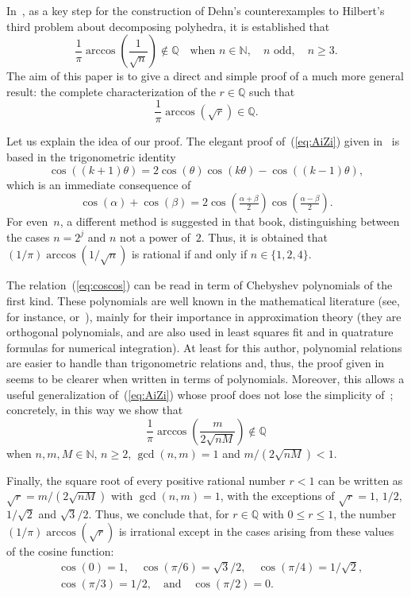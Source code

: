 \documentclass[10pt,a4paper]{article}
\newcommand{\Q}{\mathbb{Q}}
\newcommand{\N}{\mathbb{N}}
\theoremstyle{remark}
\begin{document}
In~\cite[Chapter~6]{AiZi}, as a key step for the construction of Dehn's
counterexamples to Hilbert's third problem about decomposing 
polyhedra, it is established that
\begin{equation}
\label{eq:AiZi}
  \frac{1}{\pi} \arccos\left(\frac{1}{\sqrt{n}}\right) \notin \Q
  \quad\mbox{when }n \in \N,\quad n\mbox{ odd},\quad n \ge 3.
\end{equation}
The aim of this paper is to give a direct and simple proof of
a much more general result: the complete characterization of the
$r \in \Q$ such that
$$
  \frac{1}{\pi} \arccos\left(\sqrt{r}\right) \in \Q.
$$

Let us explain the idea of our proof.
The elegant proof of~(\ref{eq:AiZi}) given in~\cite[Chapter~6]{AiZi}
is based in the trigonometric identity
\begin{equation}
\label{eq:coscos}
  \cos((k+1)\theta) = 2\cos(\theta)\cos(k\theta) - \cos((k-1)\theta),
\end{equation}
which is an immediate consequence of
$$
  \cos(\alpha) + \cos(\beta)
  = 2 \cos(\tfrac{\alpha+\beta}{2}) \cos(\tfrac{\alpha-\beta}{2}).
$$
For even~$n$, a different method is suggested in that book, distinguishing
between the cases $n=2^j$ and $n$ not a power of~$2$.
Thus, it is obtained that $(1/\pi)\arccos(1/\sqrt{n})$ is rational
if and only if $n \in \{1,2,4\}$.

The relation~(\ref{eq:coscos}) can be read in term of
Chebyshev polynomials of the first kind.
These polynomials are well known in the mathematical literature
(see, for instance, \cite{Wei} or~\cite{Te}),
mainly for their importance in approximation theory (they are orthogonal polynomials,
and are also used in least squares fit and in quatrature formulas for
numerical integration).
At least for this author, polynomial relations
are easier to handle than trigonometric relations and, thus, the proof
given in~\cite[Chapter~6]{AiZi} seems to be clearer when written in terms
of polynomials. Moreover, this allows a useful generalization
of~(\ref{eq:AiZi}) whose proof does not lose the simplicity of~\cite{AiZi};
concretely, in this way we show that
$$
  \frac{1}{\pi} \arccos\left(\frac{m}{2\sqrt{nM}}\right) \notin \Q
$$
when $n,m,M \in \N$, $n \ge 2$, $\gcd(n,m) = 1$ and $m/(2\sqrt{nM}) < 1$.

Finally, the square root of every positive rational number $r<1$
can be written as $\sqrt{r} = m/(2\sqrt{nM})$ with $\gcd(n,m) = 1$, with the exceptions
of $\sqrt{r} = 1$, $1/2$, $1/\sqrt{2}$ and $\sqrt{3}/2$. Thus, we conclude
that, for $r \in \Q$ with $0 \le r \le 1$, the number $(1/\pi)\arccos(\sqrt{r})$
is irrational except in the cases arising from these values of the cosine function:
\begin{equation}
\label{eq:cos}
\begin{aligned}
  &\cos(0) = 1,\quad \cos(\pi/6) = \sqrt{3}/2,\quad
  \cos(\pi/4) = 1/\sqrt{2},\\
  &\cos(\pi/3) = 1/2, \quad\mbox{and}\quad \cos(\pi/2) = 0.
\end{aligned}
\end{equation}
\end{document}
